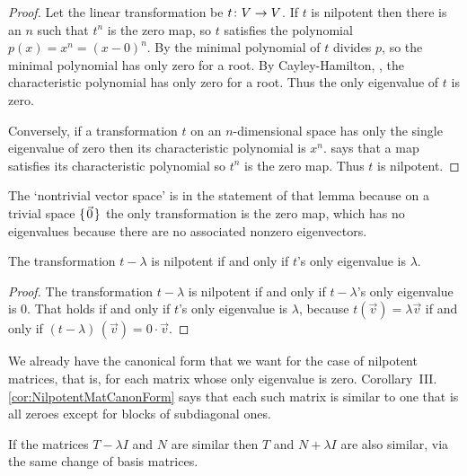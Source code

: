 \begin{proof}
Let the linear transformation be $\mbox{$t\colon V\to V$}$.
If $t$ is nilpotent then there is an $n$ such that $t^n$ is the zero map,
so $t$ satisfies the polynomial $p(x)=x^n=(x-0)^n$.
By  the minimal polynomial of 
$t$ divides $p$, so the minimal polynomial has only zero for a root.
By Cayley-Hamilton, ,
the characteristic polynomial has only zero for a root.
Thus the only eigenvalue of $t$ is zero.

Conversely, if a transformation \( t \) on an
\( n \)-dimensional space has only the single eigenvalue of zero 
then its characteristic polynomial is \( x^n \). 
 says that a map satisfies its
characteristic polynomial so \( t^n \) is the zero map.
Thus $t$ is nilpotent.
\end{proof}

\noindent The `nontrivial vector space' is in the statement of 
that lemma because on a trivial
space $\mbox{$\{\hspace{0.1em}\vec{0}\hspace{0.1em}\}$}$ the only transformation is the zero map, which has
no eigenvalues because there are no associated nonzero eigenvectors.

\begin{corollary} \label{cor:tMinLambdaNilpotent}
The transformation $t-\lambda$ is nilpotent if and only if 
$t$'s only eigenvalue is $\lambda$.   
\end{corollary}

\begin{proof}
The transformation \( t-\lambda \) is nilpotent if and only if
$t-\lambda$'s only eigenvalue is \( 0 \).
That holds if and only if $t$'s only eigenvalue is $\lambda$, because
\( t(\vec{v})=\lambda\vec{v} \) if and 
only if \( (t-\lambda)\,(\vec{v})=0\cdot\vec{v} \).
\end{proof}

We already have the canonical form that we want for 
the case of nilpotent matrices, 
that is, for each matrix whose only eigenvalue is zero.
Corollary~III.\ref{cor:NilpotentMatCanonForm} says that each 
such matrix is similar to one that is all
zeroes except for blocks of subdiagonal ones.

\begin{lemma}   \label{le:SimRespAddScalar}
If the matrices \( T-\lambda I \) and \( N \) are similar 
then \( T \) and \( N+\lambda I \) are also similar,
via the same change of basis matrices.
\end{lemma}

